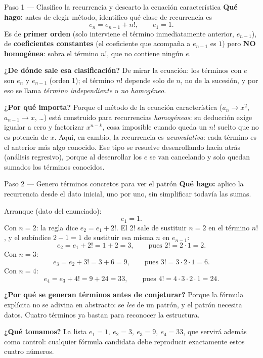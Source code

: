 \documentclass[11pt]{article}
\begin{document}
\begin{paso}{Paso 1 --- Clasifico la recurrencia y descarto la ecuación característica}
\textbf{Qué hago:} antes de elegir método, identifico qué clase de recurrencia es
\[
e_n = e_{n-1} + n! ,\qquad e_1 = 1 .
\]
Es de \textbf{primer orden} (solo interviene el término inmediatamente anterior, $e_{n-1}$), de \textbf{coeficientes constantes} (el coeficiente que acompaña a $e_{n-1}$ es $1$) pero \textbf{NO homogénea}: sobra el término $n!$, que no contiene ningún $e$.

\textbf{¿De dónde sale esa clasificación?} De mirar la ecuación: los términos con $e$ son $e_n$ y $e_{n-1}$ (orden 1); el término $n!$ depende solo de $n$, no de la sucesión, y por eso se llama \emph{término independiente} o \emph{no homogéneo}.

\textbf{¿Por qué importa?} Porque el método de la ecuación característica ($a_n\to x^2$, $a_{n-1}\to x$, \dots) está construido para recurrencias \emph{homogéneas}: su deducción exige igualar a cero y factorizar $x^{n-k}$, cosa imposible cuando queda un $n!$ suelto que no es potencia de $x$. Aquí, en cambio, la recurrencia es \emph{acumulativa}: cada término es el anterior más algo conocido. Ese tipo se resuelve desenrollando hacia atrás (análisis regresivo), porque al desenrollar los $e$ se van cancelando y solo quedan sumados los términos conocidos.
\end{paso}

\begin{paso}{Paso 2 --- Genero términos concretos para ver el patrón}
\textbf{Qué hago:} aplico la recurrencia desde el dato inicial, uno por uno, sin simplificar todavía las sumas.

Arranque (dato del enunciado):
\[
e_1 = 1 .
\]
Con $n=2$: la regla dice $e_2=e_1+2!$. El $2!$ sale de sustituir $n=2$ en el término $n!$, y el subíndice $2-1=1$ de sustituir esa misma $n$ en $e_{n-1}$:
\[
e_2 = e_1 + 2! = 1 + 2 = 3 ,\qquad\text{pues } 2!=2\cdot 1=2 .
\]
Con $n=3$:
\[
e_3 = e_2 + 3! = 3 + 6 = 9 ,\qquad\text{pues } 3!=3\cdot2\cdot1=6 .
\]
Con $n=4$:
\[
e_4 = e_3 + 4! = 9 + 24 = 33 ,\qquad\text{pues } 4!=4\cdot3\cdot2\cdot1=24 .
\]

\textbf{¿Por qué se generan términos antes de conjeturar?} Porque la fórmula explícita no se adivina en abstracto: se \emph{lee} de un patrón, y el patrón necesita datos. Cuatro términos ya bastan para reconocer la estructura.

\textbf{¿Qué tomamos?} La lista $e_1=1,\ e_2=3,\ e_3=9,\ e_4=33$, que servirá además como control: cualquier fórmula candidata debe reproducir exactamente estos cuatro números.
\end{paso}
\end{document}
